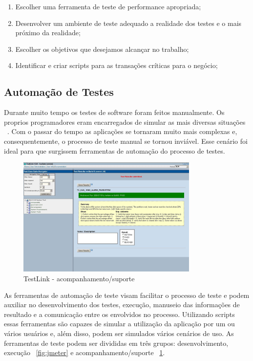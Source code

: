 \begin{enumerate}
\item Escolher uma ferramenta de teste de performance apropriada;
\item Desenvolver um ambiente de teste adequado a realidade dos testes e o mais próximo da realidade;
\item Escolher os objetivos que desejamos alcançar no trabalho;
\item Identificar e criar scripts para as transações críticas para o negócio;
\end{enumerate}


\subsection{Automação de Testes}

Durante muito tempo os testes de software foram feitos manualmente. Os proprios programadores eram encarregados de simular as mais diversas situações ~\cite{rios2006teste}. Com o passar do tempo as aplicações se tornaram muito mais complexas e, consequentemente, o processo de teste manual se tornou inviável. Esse cenário foi ideal para que surgissem ferramentas de automação do processo de testes.

	\begin{figure}[!htbp]
		\begin{center}
			\includegraphics[width=0.8\textwidth]{testlink}
		\end{center}
		\caption{TestLink - acompanhamento/suporte ~\cite{siteTestLink}}
		\label{fig:testlink}
	\end{figure}

As ferramentas de automação de teste visam facilitar o processo de teste e podem auxiliar no desenvolvimento dos testes, execução, manuseio das informações de resultado e a comunicação entre os envolvidos no processo. Utilizando scripts essas ferramentas são capazes de simular a utilização da aplicação por um ou vários usuários e, além disso, podem ser simulados vários cenários de uso. As ferramentas de teste podem ser divididas em três grupos: desenvolvimento, execução ~\ref{fig:jmeter} e acompanhamento/suporte ~\ref{fig:testlink}.

